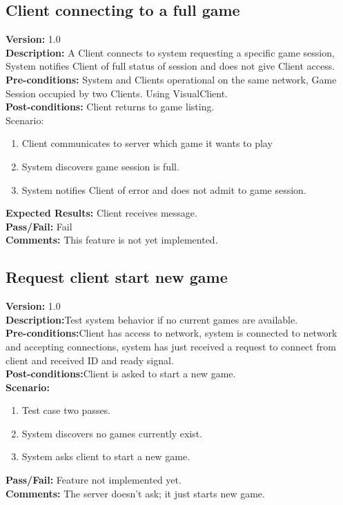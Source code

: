 \documentclass[12pt]{article}
\begin{document}
    \subsection{Client connecting to a full game}
    \label{sec:fullGameConnect}
    \textbf{Version:} 1.0\\
    \textbf{Description:} A Client connects to system requesting a specific game session, System notifies Client of full status of session and does not give Client access.\\
    \textbf{Pre-conditions:} System and Clients operational on the same network, Game Session occupied by two Clients. Using VisualClient.\\
    \textbf{Post-conditions:} Client returns to game listing.\\
    Scenario:
    \begin{enumerate}
        \item Client communicates to server which game it wants to play
        \item System discovers game session is full.
        \item System notifies Client of error and does not admit to game session.
    \end{enumerate}
    \textbf{Expected Results:} Client receives message.\\
    \textbf{Pass/Fail:} Fail\\
    \textbf{Comments:} This feature is not yet implemented.\\

    \subsection{Request client start new game}
    \textbf{Version:} 1.0\\
    \textbf{Description:}Test system behavior if no current games are available.\\
    \textbf{Pre-conditions:}Client has access to network, system is connected to network and accepting connections, system has just received a request to connect from client and received ID and ready signal.\\
    \textbf{Post-conditions:}Client is asked to start a new game.\\
    \textbf{Scenario:}
    \begin{enumerate}
        \item Test case two passes.
        \item System discovers no games currently exist.
        \item System asks client to start a new game.
    \end{enumerate}
    \textbf{Pass/Fail:} Feature not implemented yet. \\
    \textbf{Comments:} The server doesn't ask; it just starts new game.\\
\end{document}

